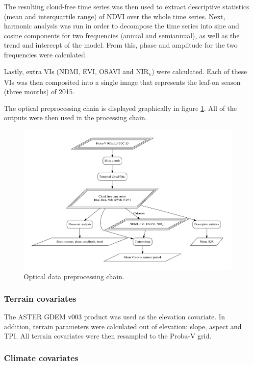 \documentclass[a4paper,10pt]{article}
\begin{document}
The resulting cloud-free time series was then used to extract descriptive statistics (mean and interquartile range) of NDVI over the whole time series.
Next, harmonic analysis was run in order to decompose the time series into sine and cosine components for two frequencies (annual and semiannual), as well as the trend and intercept of the model.
From this, phase and amplitude for the two frequencies were calculated.

Lastly, extra \glspl{VI} (NDMI, EVI, OSAVI and NIR\textsubscript{v}) were calculated.
Each of these \glspl{VI} was then composited into a single image that represents the leaf-on season (three months) of 2015.

The optical preprocessing chain is displayed graphically in figure \ref{fig-preprocessing-optical}.
All of the outputs were then used in the processing chain.

\begin{figure}
 \includegraphics[width=\textwidth]{article-figures/flowcharts/preprocessing-optical}
 \caption{Optical data preprocessing chain.}
 \label{fig-preprocessing-optical}
\end{figure}

\subsubsection{Terrain covariates}

The ASTER GDEM v003 \citep{ASTGTM003} product was used as the elevation covariate.
In addition, terrain parameters were calculated out of elevation: slope, aspect and \ac{TPI}.
All terrain covariates were then resampled to the Proba-V grid.

\subsubsection{Climate covariates}
\end{document}
